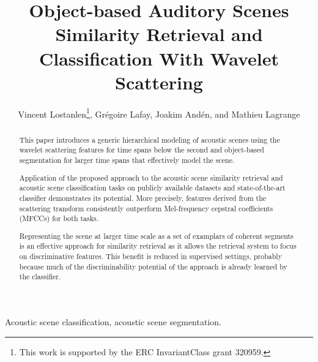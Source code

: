 \documentclass[journal]{IEEEtran}
\begin{document}
%
\title{Object-based Auditory Scenes Similarity Retrieval and Classification With Wavelet Scattering}

\author{Vincent Lostanlen\thanks{This work is supported by the ERC InvariantClass grant 320959.}, Gr\'egoire Lafay, Joakim And\'en, and Mathieu Lagrange}


\maketitle

\begin{abstract}

This paper introduces a generic hierarchical modeling of acoustic scenes using the wavelet scattering features for time spans below the second and object-based segmentation for larger time spans that effectively model the scene. 

Application of the proposed approach to the acoustic scene similarity retrieval and acoustic scene classification tasks on publicly available datasets and state-of-the-art classifier demonstrates its potential. More precisely, features derived from the scattering transform consistently outperform Mel-frequency cepstral coefficients (MFCCs) for both tasks. 

Representing the scene at larger time scale as a set of examplars of coherent segments is an effective approach for similarity retrieval as it allows the retrieval system to focus on discriminative features. This benefit is reduced in supervised settings, probably because much of the discriminability potential of the approach is already learned by the classifier.

\end{abstract}

\begin{IEEEkeywords}
Acoustic scene classification, acoustic scene segmentation.
\end{IEEEkeywords}

%
\IEEEpeerreviewmaketitle
\end{document}
